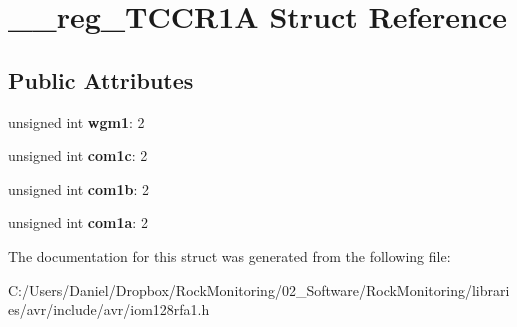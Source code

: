 \hypertarget{struct____reg___t_c_c_r1_a}{}\section{\+\_\+\+\_\+reg\+\_\+\+T\+C\+C\+R1A Struct Reference}
\label{struct____reg___t_c_c_r1_a}
\subsection*{Public Attributes}
\begin{DoxyCompactItemize}
\item 
unsigned int {\bfseries wgm1}\+: 2\hypertarget{struct____reg___t_c_c_r1_a_ad94efd0bddbacb478000bf92bf01f9e6}{}\label{struct____reg___t_c_c_r1_a_ad94efd0bddbacb478000bf92bf01f9e6}

\item 
unsigned int {\bfseries com1c}\+: 2\hypertarget{struct____reg___t_c_c_r1_a_ae306ab1f83f394202fb1e8522654411a}{}\label{struct____reg___t_c_c_r1_a_ae306ab1f83f394202fb1e8522654411a}

\item 
unsigned int {\bfseries com1b}\+: 2\hypertarget{struct____reg___t_c_c_r1_a_a45ccc1dafd6d3ef88f80467ae851ca20}{}\label{struct____reg___t_c_c_r1_a_a45ccc1dafd6d3ef88f80467ae851ca20}

\item 
unsigned int {\bfseries com1a}\+: 2\hypertarget{struct____reg___t_c_c_r1_a_a334bcb834f09d2df71c30d7d8dda2bb5}{}\label{struct____reg___t_c_c_r1_a_a334bcb834f09d2df71c30d7d8dda2bb5}

\end{DoxyCompactItemize}


The documentation for this struct was generated from the following file\+:\begin{DoxyCompactItemize}
\item 
C\+:/\+Users/\+Daniel/\+Dropbox/\+Rock\+Monitoring/02\+\_\+\+Software/\+Rock\+Monitoring/libraries/avr/include/avr/iom128rfa1.\+h\end{DoxyCompactItemize}
